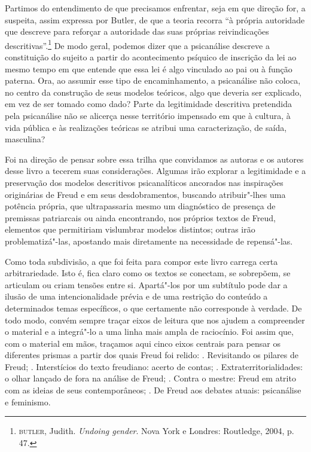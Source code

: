 Partimos do entendimento de que precisamos enfrentar, seja em que
direção for, a suspeita, assim expressa por Butler, de que a teoria
recorra ``à própria autoridade que descreve para reforçar a autoridade
das suas próprias reivindicações descritivas''.\footnote{\textsc{butler}, Judith. \emph{Undoing
gender}. Nova York e Londres: Routledge, 2004, p. 47.} De modo geral,
podemos dizer que a psicanálise descreve a constituição do sujeito a
partir do acontecimento psíquico de inscrição da lei ao mesmo tempo em
que entende que essa lei é algo vinculado ao pai ou à função paterna.
Ora, ao assumir esse tipo de encaminhamento, a psicanálise não coloca,
no centro da construção de seus modelos teóricos, algo que deveria ser
explicado, em vez de ser tomado como dado? Parte da legitimidade
descritiva pretendida pela psicanálise não se alicerça nesse
território impensado em que à cultura, à vida pública e às realizações
teóricas se atribui uma caracterização, de saída, masculina?

Foi na direção de pensar sobre essa trilha que convidamos as autoras e
os autores desse livro a tecerem suas considerações. Algumas irão
explorar a legitimidade e a preservação dos modelos descritivos
psicanalíticos ancorados nas inspirações originárias de Freud e em seus
desdobramentos, buscando atribuir"-lhes uma potência própria, que
ultrapassaria mesmo um diagnóstico de presença de premissas patriarcais
ou ainda encontrando, nos próprios textos de Freud, elementos que
permitiriam vislumbrar modelos distintos; outras irão problematizá"-las,
apostando mais diretamente na necessidade de repensá"-las.

\asterisc

Como toda subdivisão, a que foi feita para compor este livro carrega
certa arbitrariedade. Isto é, fica claro como os textos se conectam, se
sobrepõem, se articulam ou criam tensões entre si. Apartá"-los por um
subtítulo pode dar a ilusão de uma intencionalidade prévia e de uma
restrição do conteúdo a determinados temas específicos, o que certamente
não corresponde à verdade. De todo modo, convém sempre traçar eixos de
leitura que nos ajudem a compreender o material e a integrá"-lo a uma
linha mais ampla de raciocínio. Foi assim que, com o material em mãos,
traçamos aqui cinco eixos centrais para pensar os diferentes prismas a
partir dos quais Freud foi relido: . Revisitando os pilares de Freud;
. Interstícios do texto freudiano: acerto de contas; .
Extraterritorialidades: o olhar lançado de fora na análise de Freud; .
Contra o mestre: Freud em atrito com as ideias de seus contemporâneos;
. De Freud aos debates atuais: psicanálise e feminismo.

